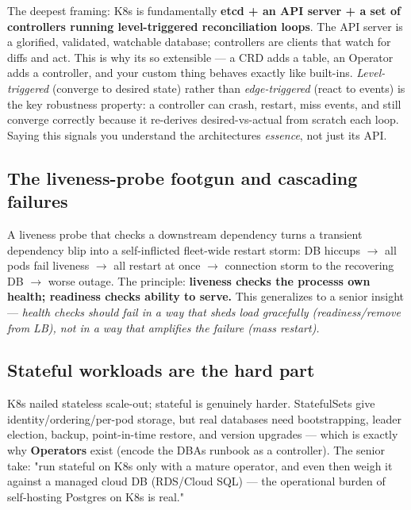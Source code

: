 \documentclass[11pt]{article}
\begin{document}
The deepest framing: K8s is fundamentally \textbf{etcd + an API server + a set of controllers running level-triggered reconciliation loops}. The API server is a glorified, validated, watchable database; controllers are clients that watch for diffs and act. This is why it\textquotesingle s so extensible --- a CRD adds a table, an Operator adds a controller, and your custom thing behaves exactly like built-ins. \emph{Level-triggered} (converge to desired state) rather than \emph{edge-triggered} (react to events) is the key robustness property: a controller can crash, restart, miss events, and still converge correctly because it re-derives desired-vs-actual from scratch each loop. Saying this signals you understand the architecture\textquotesingle s \emph{essence}, not just its API.

\subsection{The liveness-probe footgun and cascading failures}\label{the-liveness-probe-footgun-and-cascading-failures}

A liveness probe that checks a downstream dependency turns a transient dependency blip into a self-inflicted fleet-wide restart storm: DB hiccups \(\rightarrow\) all pods fail liveness \(\rightarrow\) all restart at once \(\rightarrow\) connection storm to the recovering DB \(\rightarrow\) worse outage. The principle: \textbf{liveness checks the process\textquotesingle s own health; readiness checks ability to serve.} This generalizes to a senior insight --- \emph{health checks should fail in a way that sheds load gracefully (readiness/remove from LB), not in a way that amplifies the failure (mass restart).}

\subsection{Stateful workloads are the hard part}\label{stateful-workloads-are-the-hard-part}

K8s nailed stateless scale-out; stateful is genuinely harder. StatefulSets give identity/ordering/per-pod storage, but real databases need bootstrapping, leader election, backup, point-in-time restore, and version upgrades --- which is exactly why \textbf{Operators} exist (encode the DBA\textquotesingle s runbook as a controller). The senior take: "run stateful on K8s only with a mature operator, and even then weigh it against a managed cloud DB (RDS/Cloud SQL) --- the operational burden of self-hosting Postgres on K8s is real."
\end{document}
